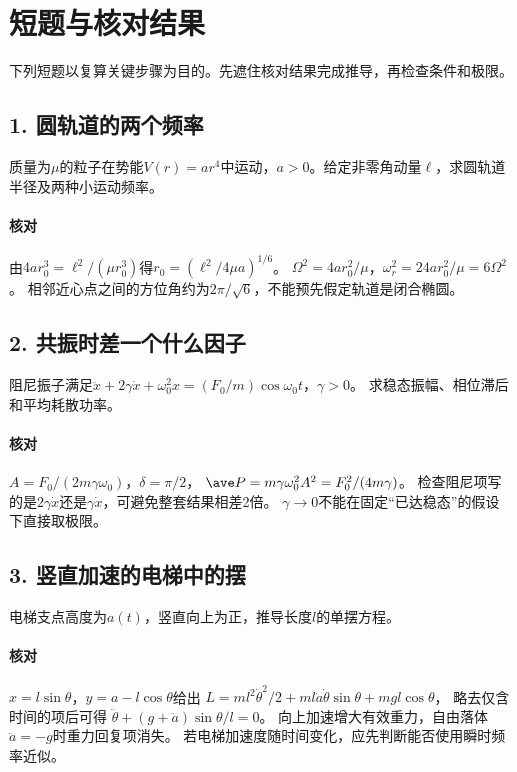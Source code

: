 \section{短题与核对结果}
下列短题以复算关键步骤为目的。先遮住核对结果完成推导，再检查条件和极限。

\subsection*{1. 圆轨道的两个频率}
质量为$\mu$的粒子在势能$V(r)=ar^4$中运动，$a>0$。给定非零角动量$\ell$，求圆轨道半径及两种小运动频率。

\paragraph{核对}
由$4ar_0^3=\ell^2/(\mu r_0^3)$得$r_0=(\ell^2/4\mu a)^{1/6}$。
$\Omega^2=4ar_0^2/\mu$，$\omega_r^2=24ar_0^2/\mu=6\Omega^2$。
相邻近心点之间的方位角约为$2\pi/\sqrt6$，不能预先假定轨道是闭合椭圆。

\subsection*{2. 共振时差一个什么因子}
阻尼振子满足$\ddot x+2\gamma\dot x+\omega_0^2x=(F_0/m)\cos\omega_0t$，$\gamma>0$。
求稳态振幅、相位滞后和平均耗散功率。

\paragraph{核对}
$A=F_0/(2m\gamma\omega_0)$，$\delta=\pi/2$，
$\ave P=m\gamma\omega_0^2A^2=F_0^2/(4m\gamma)$。
检查阻尼项写的是$2\gamma\dot x$还是$\gamma\dot x$，可避免整套结果相差2倍。
$\gamma\to0$不能在固定“已达稳态”的假设下直接取极限。

\subsection*{3. 竖直加速的电梯中的摆}
电梯支点高度为$a(t)$，竖直向上为正，推导长度$l$的单摆方程。

\paragraph{核对}
$x=l\sin\theta$，$y=a-l\cos\theta$给出
$L=ml^2\dot\theta^2/2+ml\dot a\dot\theta\sin\theta+mgl\cos\theta$，
略去仅含时间的项后可得
$\ddot\theta+(g+\ddot a)\sin\theta/l=0$。
向上加速增大有效重力，自由落体$\ddot a=-g$时重力回复项消失。
若电梯加速度随时间变化，应先判断能否使用瞬时频率近似。

